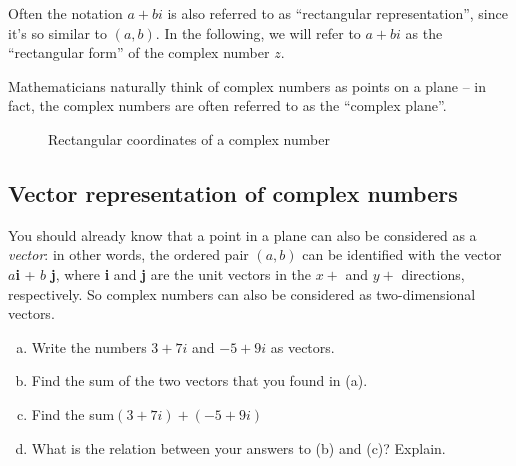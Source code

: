 Often the notation $a + bi$ is also referred to as ``rectangular representation'', since it's so similar to $(a,b)$. In the following, we will refer to $a + bi$ as the ``rectangular form'' of the complex number $z$.

Mathematicians naturally think of complex numbers as points on a plane -- in fact, the complex numbers are often referred to as the ``complex plane''.
%
\begin{figure}[hbt]  %
\begin{center}
\end{center}
\caption{Rectangular coordinates of a complex number}
\label{rectcoord}
\end{figure}

\subsection{Vector representation of complex numbers}

You should already know that a point in a plane can also be considered as a \emph{vector}: in other words, the ordered pair $(a,b)$ can be identified with the vector $a$\textbf{i} + $b$ \textbf{j}, where \textbf{i} and \textbf{j} are the unit vectors in the $x+$ and $y+$ directions, respectively. So complex numbers can also be considered as two-dimensional vectors. 

\begin{exercise}\label{exercise:complex:19} 
\begin{enumerate}[(a)]
\item
Write the numbers $3 + 7i$  and $-5 + 9i$ as  vectors.
\item
Find the sum of the two vectors that you found in (a).
\item
 Find the sum$(3 + 7i) + (-5 + 9i)$
\item
What is the relation between your answers to (b) and (c)? Explain.
\end{enumerate}
\end{exercise}

